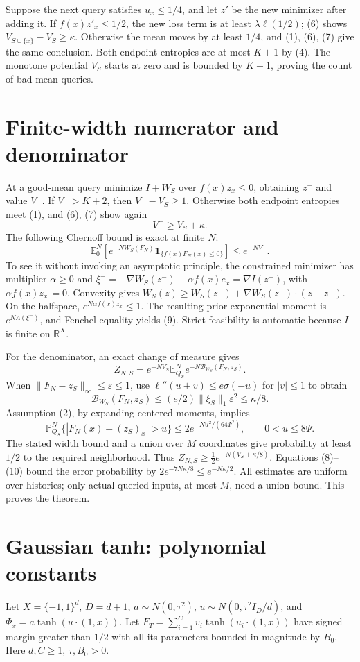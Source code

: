 \documentclass[11pt]{article}
\newcommand{\E}{\mathbb E}
\newcommand{\Pp}{\mathbb P}
\newcommand{\R}{\mathbb R}
\newcommand{\ellg}{\ell}
\begin{document}
Suppose the next query satisfies $u_x\le1/4$, and let $z'$ be the new
minimizer after adding it. If $f(x)z'_x\le1/2$, the new loss term is at
least $\lambda\ellg(1/2)$; (6) shows $V_{S\cup\{x\}}-V_S\ge\kappa$.
Otherwise the mean moves by at least $1/4$, and (1), (6), (7) give the
same conclusion. Both endpoint entropies are at most $K+1$ by (4).
The monotone potential $V_S$ starts at zero and is bounded by $K+1$,
proving the count of bad-mean queries.

\section{Finite-width numerator and denominator}
At a good-mean query minimize $I+W_S$ over $f(x)z_x\le0$, obtaining
$z^-$ and value $V^-$. If $V^->K+2$, then $V^--V_S\ge1$.
Otherwise both endpoint entropies meet (1), and (6), (7) show again
\[
                              V^-\ge V_S+\kappa.             \tag{8}
\]
The following Chernoff bound is exact at finite $N$:
\[
 \E_0^N[e^{-NW_S(F_N)}\mathbf1_{\{f(x)F_N(x)\le0\}}]
                                      \le e^{-NV^-}.         \tag{9}
\]
To see it without invoking an asymptotic principle, the constrained
minimizer has multiplier $\alpha\ge0$ and
$\xi^-=-\nabla W_S(z^-)-\alpha f(x)e_x=\nabla I(z^-)$,
with $\alpha f(x)z^-_x=0$. Convexity gives
$W_S(z)\ge W_S(z^-)+\nabla W_S(z^-)\cdot(z-z^-)$.
On the halfspace,
$e^{N\alpha f(x)z_x}\le1$. The resulting prior exponential moment is
$e^{N\Lambda(\xi^-)}$, and Fenchel equality yields (9).
Strict feasibility is automatic because $I$ is finite on $\R^X$.

For the denominator, an exact change of measure gives
\[
 Z_{N,S}=e^{-NV_S}\E_{Q_S}^N
                  e^{-N\mathcal B_{W_S}(F_N,z_S)}.           \tag{10}
\]
When $\|F_N-z_S\|_\infty\le\varepsilon\le1$, use
$\ellg''(u+v)\le e\sigma(-u)$ for $|v|\le1$ to obtain
\[
 \mathcal B_{W_S}(F_N,z_S)
           \le(e/2)\|\xi_S\|_1\varepsilon^2\le\kappa/8.
\]
Assumption (2), by expanding centered moments, implies
\[
 \Pp_{Q_S}^N\{|F_N(x)-(z_S)_x|>u\}
       \le2e^{-Nu^2/(64\Psi^2)},\qquad 0<u\le8\Psi.
\]
The stated width bound and a union over $M$ coordinates give probability
at least $1/2$ to the required neighborhood. Thus
$Z_{N,S}\ge\tfrac12 e^{-N(V_S+\kappa/8)}$. Equations (8)--(10) bound
the error probability by $2e^{-7N\kappa/8}\le e^{-N\kappa/2}$.
All estimates are uniform over histories; only actual queried inputs,
at most $M$, need a union bound. This proves the theorem.

\section{Gaussian tanh: polynomial constants}
Let $X=\{-1,1\}^d$, $D=d+1$, $a\sim N(0,\tau^2)$,
$u\sim N(0,\tau^2I_D/d)$, and
$\Phi_x=a\tanh(u\cdot(1,x))$. Let
$F_T=\sum_{i=1}^C v_i\tanh(u_i\cdot(1,x))$ have signed margin
greater than $1/2$ with all its parameters bounded in magnitude by $B_0$.
Here $d,C\ge1$, $\tau,B_0>0$.
\end{document}
